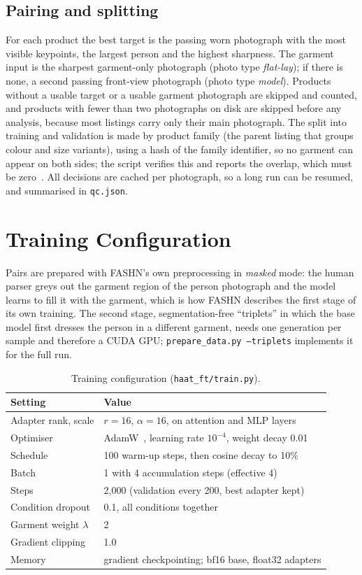 \subsection{Pairing and splitting}

For each product the best target is the passing worn photograph with the most visible keypoints, the largest person and the highest sharpness. The garment input is the sharpest garment-only photograph (photo type \emph{flat-lay}); if there is none, a second passing front-view photograph (photo type \emph{model}). Products without a usable target or a usable garment photograph are skipped and counted, and products with fewer than two photographs on disk are skipped before any analysis, because most listings carry only their main photograph. The split into training and validation is made by product family (the parent listing that groups colour and size variants), using a hash of the family identifier, so no garment can appear on both sides; the script verifies this and reports the overlap, which must be zero~\cite{leakage}. All decisions are cached per photograph, so a long run can be resumed, and summarised in \texttt{qc.json}.

\section{Training Configuration}

Pairs are prepared with FASHN's own preprocessing in \emph{masked} mode: the human parser greys out the garment region of the person photograph and the model learns to fill it with the garment, which is how FASHN describes the first stage of its own training. The second stage, segmentation-free ``triplets'' in which the base model first dresses the person in a different garment, needs one generation per sample and therefore a CUDA GPU; \texttt{prepare\_data.py --triplets} implements it for the full run.

\begin{table}[!htbp]
\centering
\caption{Training configuration (\texttt{haat\_ft/train.py}).}
\label{tab:traincfg}
\small
\begin{tabularx}{\linewidth}{@{}L{55mm}Y@{}}
\toprule
\textbf{Setting} & \textbf{Value}\\
\midrule
Adapter rank, scale & $r = 16$, $\alpha = 16$, on attention and MLP layers\\
Optimiser & AdamW~\cite{adamw}, learning rate $10^{-4}$, weight decay 0.01\\
Schedule & 100 warm-up steps, then cosine decay to 10\%\\
Batch & 1 with 4 accumulation steps (effective 4)\\
Steps & 2{,}000 (validation every 200, best adapter kept)\\
Condition dropout & 0.1, all conditions together\\
Garment weight $\lambda$ & 2\\
Gradient clipping & 1.0\\
Memory & gradient checkpointing; bf16 base, float32 adapters\\
\bottomrule
\end{tabularx}
\end{table}

